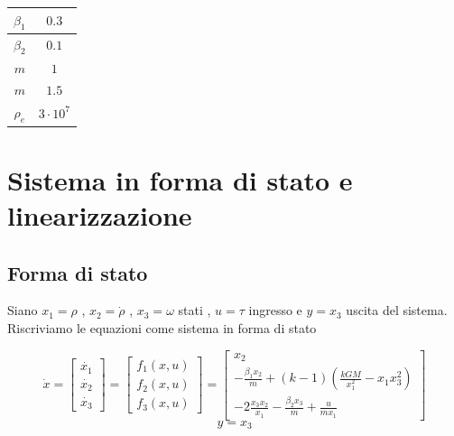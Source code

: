 \documentclass{article}
\begin{document}
\begin{center}
\begin{tabular}{||c | c ||} 

 \hline\hline
 $\beta_1$ & $0.3$ \\ 
 \hline
 $\beta_2$ & $0.1$  \\
 \hline
 $m$ & $1$ \\
 \hline
 $m$  & $1.5$  \\
 \hline
 $\rho_e $  & $3\cdot 10^{7}$ \\ [2ex] 
 \hline
\end{tabular}
\end{center}






\section{Sistema in forma di stato e linearizzazione}
\subsection{Forma di stato}
Siano $x_1=\rho$ , $x_2=\Dot{\rho}$ , $x_3=\omega$ stati , $u=\tau$ ingresso e $y=x_3$ uscita del sistema.\\
Riscriviamo le equazioni come sistema in forma di stato\\
\begin{large}
\[
\Dot{x}=
\begin{bmatrix} \Dot{x_1} \\\Dot{x_2} \\ \Dot{x_3}\end{bmatrix} =
\begin{bmatrix} f_1(x,u) \\ f_2(x,u) \\ f_3(x,u)\end{bmatrix} =
\begin{bmatrix} x_2 \\
-\frac{\beta_1 x_2}{m} + (k-1)(\frac{kG M}{x_1^2} - x_1 x_3^2) \\ 
-2\frac{x_3 x_2}{x_1} - \frac{\beta_2 x_3}{m} + \frac{u}{m x_1}  \end{bmatrix}
\]
\[
y=x_3
\]
\end{large}
\end{document}
